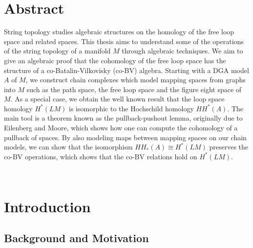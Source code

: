 \documentclass{scrartcl}
\theoremstyle{plain}
\theoremstyle{definition}
\newcommand{\iso}{\cong}
\begin{document}
\pagestyle{plain}
\makeTitel

\newpage




\section*{Abstract}
String topology studies algebraic structures on the homology of the free loop space and related spaces. This thesis aims to understand some of the operations of the string topology of a manifold $M$ through algebraic techniques. We aim to give an algebraic proof that the cohomology of the free loop space has the structure of a co-Batalin-Vilkovisky (co-BV) algebra. Starting with a DGA model $A$ of $M$, we construct chain complexes which model mapping spaces from graphs into $M$ such as the path space, the free loop space and the figure eight space of $M$. As a special case, we obtain the well known result that the loop space homology $H^*(LM)$ is isomorphic to the Hochschild homology $HH^*(A)$. The main tool is a theorem known as the pullback-pushout lemma, originally due to Eilenberg and Moore, which shows how one can compute the cohomology of a pullback of spaces. By also modeling maps between mapping spaces on our chain models, we can show that the isomorphism $HH_*(A)\iso H^*(LM)$ preserves the co-BV operations, which shows that the co-BV relations hold on $H^*(LM)$.

\restoregeometry

\newpage




\tableofcontents

\newpage~
\cleardoublepage



\newpage


\section{Introduction}

\subsection{Background and Motivation}
\end{document}
